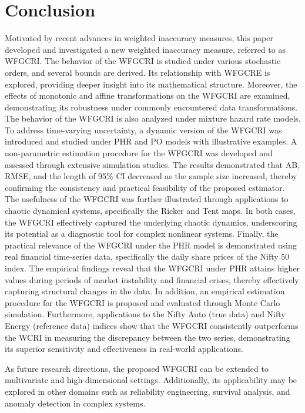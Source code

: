 \documentclass[12pt,a4paper]{article}
\numberwithin{equation}{section}
\begin{document}
\section{Conclusion}
Motivated by recent advances in weighted inaccuracy measures, this paper developed and investigated a new weighted inaccuracy measure, referred to as WFGCRI. The behavior of the WFGCRI is studied under various stochastic orders, and several bounds are derived. Its relationship with WFGCRE is explored, providing deeper insight into its mathematical structure. Moreover, the effects of monotonic and affine transformations on the WFGCRI are examined, demonstrating its robustness under commonly encountered data transformations. The behavior of the WFGCRI is also analyzed under mixture hazard rate models.
To address time-varying uncertainty, a dynamic version of the WFGCRI was introduced and studied under PHR and PO models with illustrative examples.
A non-parametric estimation procedure for the WFGCRI was developed and assessed through extensive simulation studies. The results demonstrated that AB, RMSE, and the length of 95\% CI decreased as the sample size increased, thereby confirming the consistency and practical feasibility of the proposed estimator.
The usefulness of the WFGCRI was further illustrated through applications to chaotic dynamical systems, specifically the Ricker  and  Tent maps. In both cases, the WFGCRI effectively captured the underlying chaotic dynamics, underscoring its potential as a diagnostic tool for complex nonlinear systems.
Finally, the practical relevance of the WFGCRI under the PHR model is demonstrated using real financial time-series data, specifically the daily share prices of the Nifty 50 index. The empirical findings reveal that the WFGCRI under PHR attains higher values during periods of market instability and financial crises, thereby effectively capturing structural changes in the data. In addition, an empirical estimation procedure for the WFGCRI is proposed and evaluated through Monte Carlo simulation. Furthermore, applications to the Nifty Auto (true data) and Nifty Energy (reference data) indices show that the WFGCRI consistently outperforms the WCRI in measuring the discrepancy between the two series, demonstrating its superior sensitivity and effectiveness in real-world applications.

As future research directions, the proposed WFGCRI can be extended to multivariate and high-dimensional settings. Additionally, its applicability may be explored in other domains such as reliability engineering, survival analysis, and anomaly detection in complex systems.
\end{document}
